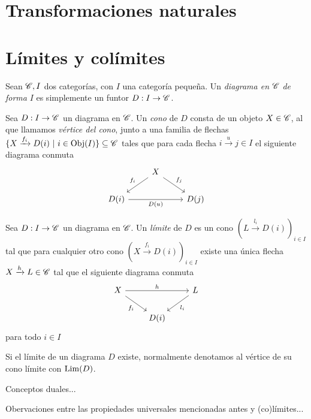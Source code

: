 \documentclass{comunicaciones}
\begin{document}
\section{Transformaciones naturales}



\section{Límites y colímites}

\begin{dfn}[Diagrama]
    Sean $\mathscr C,I$ dos categorías, con $I$ una categoría pequeña. Un \emph{diagrama en} $\mathscr C$ \emph{de forma} $I$ es simplemente un funtor $D:I\to\mathscr C$.   
\end{dfn}

\begin{dfn}
    Sea $D:I\to\mathscr C$ un diagrama en $\mathscr C$. Un \emph{cono} de $D$ consta de un objeto $X\in\mathscr C$, al que llamamos \emph{vértice del cono}, junto a una familia
    de flechas $\{X\xrightarrow{f_i}D(i) \ |\ i\in\Obj(I)\}\subseteq\C$ tales que para cada flecha $i\xrightarrow{u}j\in I$ el siguiente diagrama conmuta
    \[\begin{tikzcd}
        & X \\
        {D(i)} && {D(j)}
        \arrow["{f_i}"', from=1-2, to=2-1]
        \arrow["{f_j}", from=1-2, to=2-3]
        \arrow["{D(u)}"', from=2-1, to=2-3]
    \end{tikzcd}\]
\end{dfn}

\begin{dfn}
    Sea $D:I\to\mathscr C$ un diagrama en $\mathscr C$. Un \emph{límite} de $D$ es un cono $(L\xrightarrow{l_i}D(i))_{i\in I}$ tal que para cualquier otro cono $(X\xrightarrow{f_i}D(i))_{i\in I}$
    existe una única flecha $X\xrightarrow{h}L\in\mathscr C$ tal que el siguiente diagrama conmuta
    \[\begin{tikzcd}
        X && L \\
        & {D(i)}
        \arrow["h", from=1-1, to=1-3]
        \arrow["{f_i}"', from=1-1, to=2-2]
        \arrow["{l_i}", from=1-3, to=2-2]
    \end{tikzcd}\] para todo $i\in I$
\end{dfn}

Si el límite de un diagrama $D$ existe, normalmente denotamos al vértice de su cono límite con $\mathrm{Lim}(D)$.

Conceptos duales...

Obervaciones entre las propiedades universales mencionadas antes y (co)límites...
\end{document}
